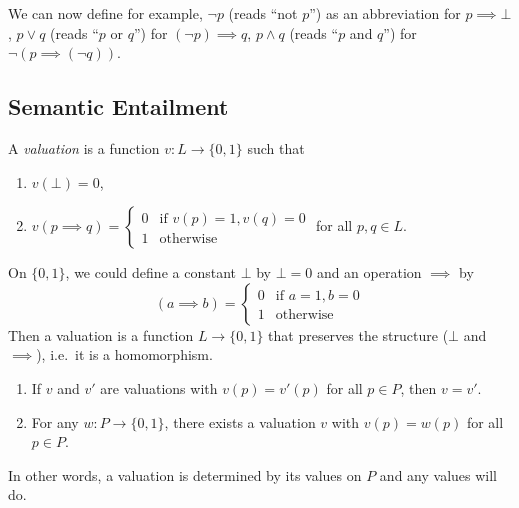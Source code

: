 \documentclass[a4paper]{article}
\begin{document}
We can now define for example, \(\neg p\) (reads ``not \(p\)'') as an abbreviation for \(p \implies \bot\), \(p \lor q\) (reads ``\(p\) or \(q\)'') for \((\neg p) \implies q\), \(p \land q\) (reads ``\(p\) and \(q\)'') for \(\neg (p \implies (\neg q))\).

\subsection{Semantic Entailment}

\begin{definition}[Valuation]
  A \emph{valuation} is a function \(v: L \to \{0, 1\}\) such that
  \begin{enumerate}
  \item \(v(\bot) = 0\),
  \item \(v(p \implies q) = \begin{cases} 0 & \text{if } v(p) = 1, v(q) = 0 \\ 1 & \text{otherwise} \end{cases}\) for all \(p, q \in L\).
  \end{enumerate}
\end{definition}

\begin{remark}
  On \(\{0, 1\}\), we could define a constant \(\bot\) by \(\bot = 0\) and an operation \(\implies\) by
  \[
    (a \implies b) =
    \begin{cases}
      0 & \text{if } a = 1, b = 0 \\
      1 & \text{otherwise}
    \end{cases}
  \]
  Then a valuation is a function \(L \to \{0, 1\}\) that preserves the structure (\(\bot\) and \(\implies\)), i.e.\ it is a homomorphism.
\end{remark}

\begin{proposition}\leavevmode
  \begin{enumerate}
  \item If \(v\) and \(v'\) are valuations with \(v(p) = v'(p)\) for all \(p \in P\), then \(v = v'\).
  \item For any \(w: P \to \{0, 1\}\), there exists a valuation \(v\) with \(v(p) = w(p)\) for all \(p \in P\).
  \end{enumerate}
\end{proposition}

In other words, a valuation is determined by its values on \(P\) and any values will do.
\end{document}
